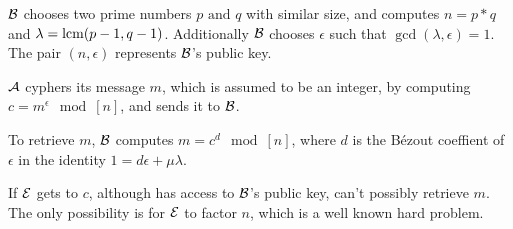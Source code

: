 \documentclass{subfiles}
\begin{document}
    \begin{procedure}
        \caption{RSA()}\label{proc:RSA-schema}
        \nl $\operatorname{\mathcal{B}}$ chooses two prime numbers $p \text{ and } q$ with similar size,
            and computes $n = p * q$ and $\lambda = \operatorname{lcm}(p - 1, q - 1)$.
            Additionally $\operatorname{\mathcal{B}}$ chooses $\epsilon$ such that $\gcd(\lambda, \epsilon) = 1$.
            The pair $(n, \epsilon)$ represents $\operatorname{\mathcal{B}}$'s public key.
            \DontPrintSemicolon\;

        \nl $\operatorname{\mathcal{A}}$ cyphers its message $m$, which is assumed to be an integer,
            by computing $c = m^{\epsilon} \mod[n]$, and sends it to $\operatorname{\mathcal{B}}$.
            \DontPrintSemicolon\;

        \nl To retrieve $m$, $\operatorname{\mathcal{B}}$ computes $m = c^{d} \mod[n]$,
            where $d$ is the Bézout coeffient of $\epsilon$ in the identity $1 = d\epsilon + \mu\lambda$.
            \DontPrintSemicolon\;

        \nl If $\operatorname{\mathcal{E}}$ gets to $c$, although has access to $\operatorname{\mathcal{B}}$'s public key,
            can't possibly retrieve $m$. The only possibility is for $\operatorname{\mathcal{E}}$ to factor $n$,
            which is a well known hard problem.
    \end{procedure}
\end{document}
